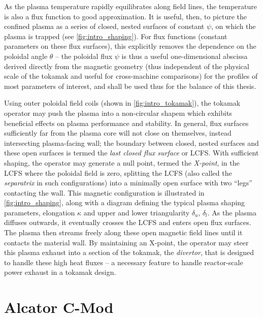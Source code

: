 \noindent As the plasma temperature rapidly equilibrates along field lines, the temperature is also a flux function to good approximation.  It is useful, then, to picture the confined plasma as a series of closed, nested surfaces of constant $\psi$, on which the plasma is trapped (see \cref{fig:intro_shaping}).  For flux functions (\ie constant parameters on these flux surfaces), this explicitly removes the dependence on the poloidal angle $\theta$ -- the poloidal flux $\psi$ is thus a useful one-dimensional abscissa derived directly from the magnetic geometry (thus independent of the physical scale of the tokamak and useful for cross-machine comparisons) for the profiles of most parameters of interest, and shall be used thus for the balance of this thesis.

Using outer poloidal field coils (shown in \cref{fig:intro_tokamak}), the tokamak operator may push the plasma into a non-circular shapem which exhibits beneficial effects on plasma performance and stability.  In general, flux surfaces sufficiently far from the plasma core will not close on themselves, instead intersecting plasma-facing wall; the boundary between closed, nested surfaces and these open surfaces is termed the \emph{last closed flux surface} or LCFS.  With sufficient shaping, the operator may generate a null point, termed the \emph{X-point}, in the LCFS where the poloidal field is zero, splitting the LCFS (also called the \emph{separatrix} in such configurations) into a minimally open surface with two ``legs'' contacting the wall.  This magnetic configuration is illustrated in \cref{fig:intro_shaping}, along with a diagram defining the typical plasma shaping parameters, elongation $\kappa$ and upper and lower triangularity $\delta_u$, $\delta_l$.  As the plasma diffuses outwards, it eventually crosses the LCFS and enters open flux surfaces.  The plasma then streams freely along these open magnetic field lines until it contacts the material wall.  By maintaining an X-point, the operator may steer this plasma exhaust into a section of the tokamak, the \emph{divertor}, that is designed to handle these high heat fluxes -- a necessary feature to handle reactor-scale power exhaust in a tokamak design.\nicesectionending


\section{Alcator C-Mod}\label{sec:intro_cmod}

